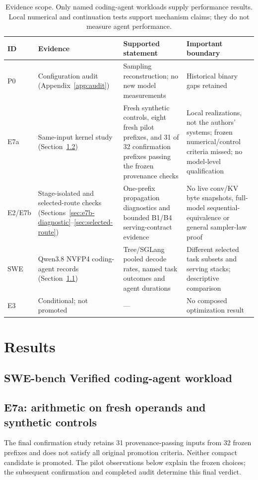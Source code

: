 \documentclass[conference]{IEEEtran}
\begin{document}
\begin{table}[t]
\caption{Evidence scope. Only named coding-agent workloads supply performance results. Local numerical and continuation tests support mechanism claims; they do not measure agent performance.}
\label{tab:evidence}
\centering\footnotesize
\begin{tabularx}{\textwidth}{@{}p{}p{}Yp{0.25\textwidth}@{}}
\toprule
ID & Evidence & Supported statement & Important boundary \\
\midrule
P0 & Configuration audit (Appendix~\ref{app:audit}) & Sampling reconstruction; no new model measurements & Historical binary gaps retained \\
E7a & Same-input kernel study (Section~\ref{sec:e7a-pilot}) & Fresh synthetic controls, eight fresh pilot prefixes, and 31 of 32 confirmation prefixes passing the frozen provenance checks & Local realizations, not the authors' systems; frozen numerical/control criteria missed; no model-level qualification \\
E2/E7b & Stage-isolated and selected-route checks (Sections~\ref{sec:e7b-diagnostic}--\ref{sec:selected-route}) & One-prefix propagation diagnostics and bounded B1/B4 serving-contract evidence & No live conv/KV byte snapshots, full-model sequential-equivalence or general sampler-law proof \\
SWE & Qwen3.8 NVFP4 coding-agent records (Section~\ref{sec:agent-workload}) & Tree/SGLang pooled decode rates, named task outcomes and agent durations & Different selected task subsets and serving stacks; descriptive comparison \\
E3 & Conditional; not promoted & --- & No composed optimization result \\
\bottomrule
\end{tabularx}
\end{table}

\section{Results}
\label{sec:results}
\subsection{SWE-bench Verified coding-agent workload}
\label{sec:agent-workload}


\subsection{E7a: arithmetic on fresh operands and synthetic controls}
\label{sec:e7a-pilot}
The final confirmation study retains 31 provenance-passing inputs from 32 frozen prefixes and does not satisfy all original promotion criteria. Neither compact candidate is promoted. The pilot observations below explain the frozen choices; the subsequent confirmation and completed audit determine this final verdict.
\end{document}
